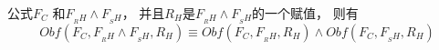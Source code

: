 %
%

\begin{lemma}\label{3:ANDrelation-Holding-Obfuscation}
公式$F_C$ 和$F_{_RH}\wedge F_{_SH}$，
并且$R_H$是$F_{_RH} \wedge F_{_SH}$的一个赋值， 则有
\begin{equation}
Obf(F_C,F_{_RH} \wedge F_{_SH},R_H)
\equiv Obf(F_C,F_{_RH},R_H) \wedge Obf(F_C,F_{_SH} ,R_H)
\end{equation}
\end{lemma}

